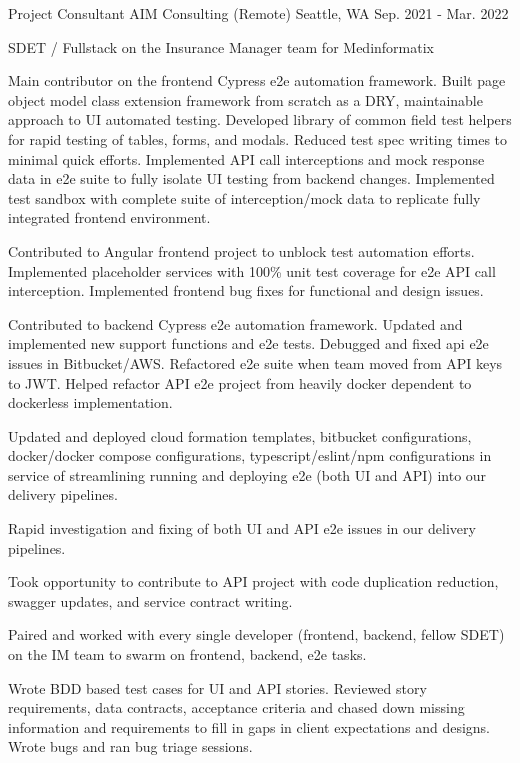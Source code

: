 \begin{cventries}
\cventry
  {Project Consultant} %
  {AIM Consulting (Remote)} %
  {Seattle, WA} %
  {Sep. 2021 - Mar. 2022} %
  {
    \begin{cvitems} %
      \item[] {SDET / Fullstack on the Insurance Manager team for Medinformatix}
      \item[]
      \item {Main contributor on the frontend Cypress e2e automation framework. Built page object model class extension framework from scratch as a DRY, maintainable approach to UI automated testing. Developed library of common field test helpers for rapid testing of tables, forms, and modals. Reduced test spec writing times to minimal quick efforts. Implemented API call interceptions and mock response data in e2e suite to fully isolate UI testing from backend changes. Implemented test sandbox with complete suite of interception/mock data to replicate fully integrated frontend environment.}
      \item {Contributed to Angular frontend project to unblock test automation efforts. Implemented placeholder services with 100\% unit test coverage for e2e API call interception. Implemented frontend bug fixes for functional and design issues.}
      \item {Contributed to backend Cypress e2e automation framework. Updated and implemented new support functions and e2e tests. Debugged and fixed api e2e issues in Bitbucket/AWS. Refactored e2e suite when team moved from API keys to JWT. Helped refactor API e2e project from heavily docker dependent to dockerless implementation.}
      \item {Updated and deployed cloud formation templates, bitbucket configurations, docker/docker compose configurations, typescript/eslint/npm configurations in service of streamlining running and deploying e2e (both UI and API) into our delivery pipelines.}
      \item {Rapid investigation and fixing of both UI and API e2e issues in our delivery pipelines.}
      \item {Took opportunity to contribute to API project with code duplication reduction, swagger updates, and service contract writing.}
      \item {Paired and worked with every single developer (frontend, backend, fellow SDET) on the IM team to swarm on frontend, backend, e2e tasks.}
      \item {Wrote BDD based test cases for UI and API stories. Reviewed story requirements, data contracts, acceptance criteria and chased down missing information and requirements to fill in gaps in client expectations and designs. Wrote bugs and ran bug triage sessions.}
    \end{cvitems}
  }


\end{cventries}
